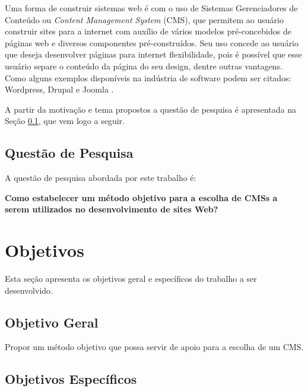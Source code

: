 Uma forma de construir sistemas web é com o uso de Sistemas Gerenciadores de Conteúdo ou \textit{Content Management System} (CMS), que permitem ao usuário construir sites para a internet com auxílio de vários modelos pré-concebidos de páginas web e diversos componentes pré-construídos. Seu uso concede ao usuário que deseja desenvolver páginas para internet flexibilidade, pois é possível que esse usuário separe o conteúdo da página do seu design, dentre outras vantagens. Como alguns exemplos disponíveis na indústria de software podem ser citados: Wordpress, Drupal e Joomla \cite{costa}.

A partir da motivação e tema propostos a questão de pesquisa é apresentada na Seção \ref{Declaração do Problema}, que vem logo a seguir.


\subsection{Questão de Pesquisa}
\label{Declaração do Problema}

A questão de pesquisa abordada por este trabalho é:

\textbf{{Como estabelecer um método objetivo para a escolha de CMSs a serem utilizados no desenvolvimento de sites Web?}}

\section{Objetivos}
\label{objEspp1}
Esta seção apresenta os objetivos geral e específicos do trabalho a ser desenvolvido.

\subsection{Objetivo Geral}
\label{Objetivo Geral}
Propor um método objetivo que possa servir de apoio para a escolha de um CMS. 

\subsection{Objetivos Específicos}

